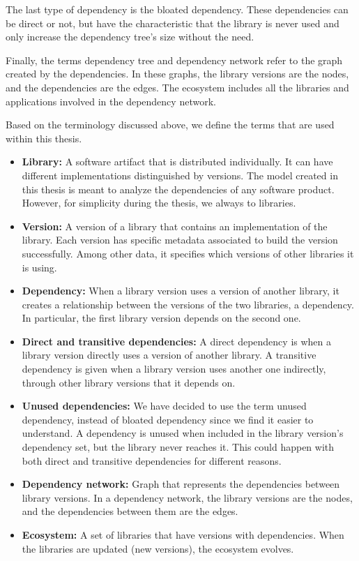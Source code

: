 The last type of dependency is the bloated dependency. These dependencies can be direct or not, but have the characteristic that the library is never used and only increase the dependency tree's size without the need.

Finally, the terms dependency tree and dependency network refer to the graph created by the dependencies. In these graphs, the library versions are the nodes, and the dependencies are the edges. The ecosystem includes all the libraries and applications involved in the dependency network.

\blankl
Based on the terminology discussed above, we define the terms that are used within this thesis.

\begin{itemize}
  \item \textbf{Library:} A software artifact that is distributed individually. It can have different implementations distinguished by versions. The model created in this thesis is meant to analyze the dependencies of any software product. However, for simplicity during the thesis, we always to libraries.

  \item \textbf{Version:} A version of a library that contains an implementation of the library. Each version has specific metadata associated to build the version successfully. Among other data, it specifies which versions of other libraries it is using.

  \item \textbf{Dependency:} When a library version uses a version of another library, it creates a relationship between the versions of the two libraries, a dependency. In particular, the first library version depends on the second one.

  \item \textbf{Direct and transitive dependencies:} A direct dependency is when a library version directly uses a version of another library. A transitive dependency is given when a library version uses another one indirectly, through other library versions that it depends on.

  \item \textbf{Unused dependencies:} We have decided to use the term unused dependency, instead of bloated dependency since we find it easier to understand. A dependency is unused when included in the library version's dependency set, but the library never reaches it. This could happen with both direct and transitive dependencies for different reasons.

  \item \textbf{Dependency network:} Graph that represents the dependencies between library versions. In a dependency network, the library versions are the nodes, and the dependencies between them are the edges.

  \item \textbf{Ecosystem:} A set of libraries that have versions with dependencies. When the libraries are updated (new versions), the ecosystem evolves.
\end{itemize}

